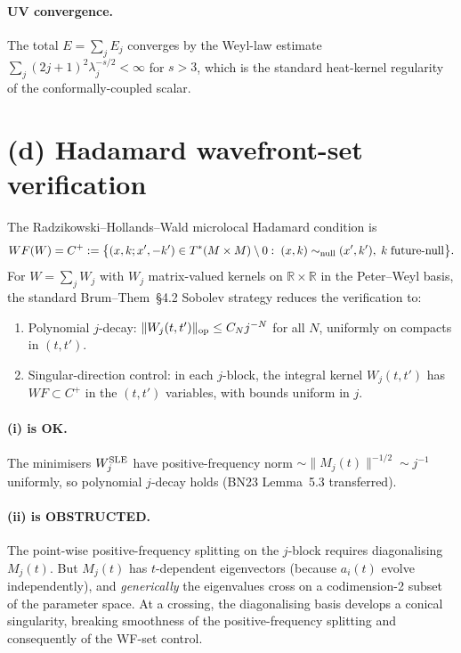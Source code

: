 \documentclass[11pt,a4paper]{article}
\theoremstyle{definition}
\begin{document}
\paragraph{UV convergence.} The total $E = \sum_j E_j$ converges by the
Weyl-law estimate $\sum_j (2j+1)^2 \lambda_j^{-s/2} <\infty$ for
$s > 3$, which is the standard heat-kernel regularity of the
conformally-coupled scalar.

\section{(d) Hadamard wavefront-set verification}

The Radzikowski--Hollands--Wald microlocal Hadamard condition is
\[
  WF(W) = C^+ := \big\{(x,k;x',-k')\in T^*(M\times M)\setminus 0:\;
  (x,k)\sim_{\rm null}(x',k'),\;k\;\text{future-null}\big\}.
\]
For $W = \sum_j W_j$ with $W_j$ matrix-valued kernels on $\mathbb R\times
\mathbb R$ in the Peter--Weyl basis, the standard Brum--Them~\S4.2 Sobolev
strategy reduces the verification to:
\begin{enumerate}
\item[(i)] Polynomial $j$-decay: $\|W_j(t,t')\|_{\rm op}\le C_N j^{-N}$
  for all $N$, uniformly on compacts in $(t,t')$.
\item[(ii)] Singular-direction control: in each $j$-block, the integral
  kernel $W_j(t,t')$ has $WF\subset C^+$ in the $(t,t')$ variables, with
  bounds uniform in $j$.
\end{enumerate}

\paragraph{(i) is OK.} The minimisers $W_j^{\rm SLE}$ have positive-frequency
norm $\sim \|M_j(t)\|^{-1/2}\sim j^{-1}$ uniformly, so polynomial $j$-decay
holds (BN23 Lemma~5.3 transferred).

\paragraph{(ii) is OBSTRUCTED.} The point-wise positive-frequency
splitting on the $j$-block requires diagonalising $M_j(t)$. But
$M_j(t)$ has $t$-dependent eigenvectors (because $a_i(t)$ evolve
independently), and \emph{generically} the eigenvalues cross on a
codimension-2 subset of the parameter space. At a crossing, the
diagonalising basis develops a conical singularity, breaking smoothness
of the positive-frequency splitting and consequently of the WF-set
control.
\end{document}
